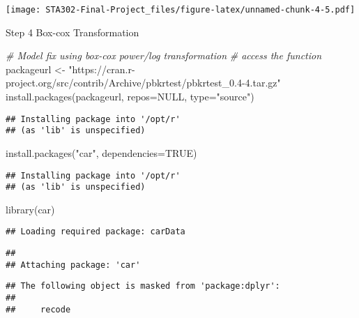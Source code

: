 \documentclass[
]{article}
\newenvironment{Shaded}{\begin{snugshade}}{\end{snugshade}}
\newcommand{\AttributeTok}[1]{\textcolor[rgb]{0.77,0.63,0.00}{#1}}
\newcommand{\CommentTok}[1]{\textcolor[rgb]{0.56,0.35,0.01}{\textit{#1}}}
\newcommand{\ConstantTok}[1]{\textcolor[rgb]{0.00,0.00,0.00}{#1}}
\newcommand{\FunctionTok}[1]{\textcolor[rgb]{0.00,0.00,0.00}{#1}}
\newcommand{\NormalTok}[1]{#1}
\newcommand{\OtherTok}[1]{\textcolor[rgb]{0.56,0.35,0.01}{#1}}
\newcommand{\StringTok}[1]{\textcolor[rgb]{0.31,0.60,0.02}{#1}}
\begin{document}
\texttt{[image: STA302-Final-Project\_files/figure-latex/unnamed-chunk-4-5.pdf]}

Step 4 Box-cox Transformation

\begin{Shaded}
\begin{Highlighting}[]
\CommentTok{\# Model fix using box{-}cox power/log transformation}
\CommentTok{\# access the function}
\NormalTok{packageurl }\OtherTok{\textless{}{-}} \StringTok{"https://cran.r{-}project.org/src/contrib/Archive/pbkrtest/pbkrtest\_0.4{-}4.tar.gz"}
\FunctionTok{install.packages}\NormalTok{(packageurl, }\AttributeTok{repos=}\ConstantTok{NULL}\NormalTok{, }\AttributeTok{type=}\StringTok{"source"}\NormalTok{)}
\end{Highlighting}
\end{Shaded}

\begin{verbatim}
## Installing package into '/opt/r'
## (as 'lib' is unspecified)
\end{verbatim}

\begin{Shaded}
\begin{Highlighting}[]
\FunctionTok{install.packages}\NormalTok{(}\StringTok{"car"}\NormalTok{, }\AttributeTok{dependencies=}\ConstantTok{TRUE}\NormalTok{)}
\end{Highlighting}
\end{Shaded}

\begin{verbatim}
## Installing package into '/opt/r'
## (as 'lib' is unspecified)
\end{verbatim}

\begin{Shaded}
\begin{Highlighting}[]
\FunctionTok{library}\NormalTok{(car)}
\end{Highlighting}
\end{Shaded}

\begin{verbatim}
## Loading required package: carData
\end{verbatim}

\begin{verbatim}
## 
## Attaching package: 'car'
\end{verbatim}

\begin{verbatim}
## The following object is masked from 'package:dplyr':
## 
##     recode
\end{verbatim}
\end{document}
